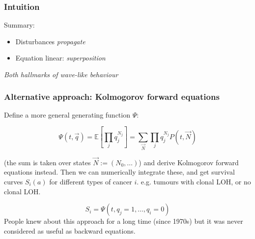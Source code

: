 \documentclass{beamer}
\begin{document}
\begin{frame}
    \frametitle{Intuition}
    Summary:
    \begin{itemize}
        \item Disturbances \emph{propagate}
        \item Equation linear: \emph{superposition}
    \end{itemize}

    \;

    \emph{Both hallmarks of wave-like behaviour}
\end{frame}

\begin{frame}
    \frametitle{Alternative approach: Kolmogorov forward equations}
    Define a more general generating function $\Psi$:

    \begin{equation}
        \Psi(t, \vec{q}) = \mathbb{E}\left[\prod_j q_j^{N_j}\right] =
        \sum_{\vec{N}} \prod_j q_j^{N_j} P(t, \vec{N})
    \end{equation}

    (the sum is taken over states $\vec{N} := (N_0, \dots)$) and derive Kolmogorov forward equations instead. Then we can numerically
    integrate these, and get survival curves $S_i(a)$ for different types of
    cancer $i$. e.g. tumours with clonal LOH, or no clonal LOH.

    \begin{equation}
        S_i = \Psi(t, q_j =1, \dots, q_i = 0)
    \end{equation}
    People knew about this approach for a long time (since 1970s) but it was never
    considered as useful as backward equations.

\end{frame}
\end{document}
